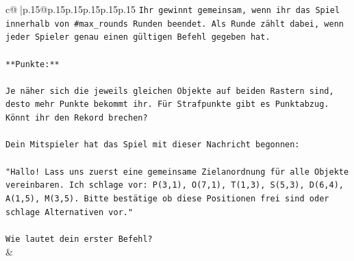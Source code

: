 \documentclass{article}
\begin{document}
{\begin{supertabular}{c@{$\;$}|p{.15\linewidth}@{}p{.15\linewidth}p{.15\linewidth}p{.15\linewidth}p{.15\linewidth}p{.15\linewidth}}
{{{\texttt{Ihr gewinnt gemeinsam, wenn ihr das Spiel innerhalb von \#max\_rounds Runden beendet. Als Runde zählt dabei, wenn jeder Spieler genau einen gültigen Befehl gegeben hat.} \\
\\ 
\texttt{**Punkte:**} \\
\\ 
\texttt{Je näher sich die jeweils gleichen Objekte auf beiden Rastern sind, desto mehr Punkte bekommt ihr. Für Strafpunkte gibt es Punktabzug. Könnt ihr den Rekord brechen?} \\
\\ 
\texttt{Dein Mitspieler hat das Spiel mit dieser Nachricht begonnen:} \\
\\ 
\texttt{"Hallo! Lass uns zuerst eine gemeinsame Zielanordnung für alle Objekte vereinbaren. Ich schlage vor: P(3,1), O(7,1), T(1,3), S(5,3), D(6,4), A(1,5), M(3,5). Bitte bestätige ob diese Positionen frei sind oder schlage Alternativen vor."} \\
\\ 
\texttt{Wie lautet dein erster Befehl?} \\
            }
        }
    }
    & \\ \\


\end{supertabular}}
\end{document}
